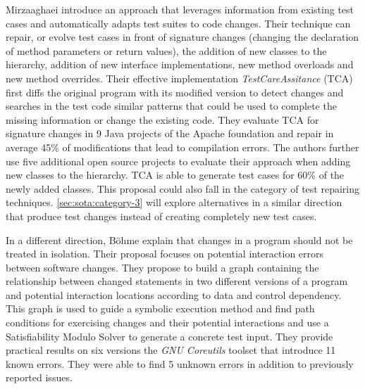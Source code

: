 Mirzaaghaei \etal\cite{Mirzaaghaei2012,mirzaaghaei2014automatic} introduce an approach that leverages information from existing test cases and automatically adapts test suites to code changes.
Their technique can repair, or evolve test cases in front of signature changes (\ie changing the declaration of method parameters or return values), the addition of new classes to the hierarchy, addition of new interface implementations, new method overloads and new method overrides. 
Their effective implementation \emph{TestCareAssitance} (TCA) first diffs the original program with its modified version to detect changes and searches in the test code similar patterns that could be used to complete the missing information or change the existing code. 
They evaluate TCA for signature changes in 9 Java projects of the Apache foundation and repair in average 45\% of modifications that lead to compilation errors. 
The authors further use five additional open source projects to evaluate their approach when adding new classes to the hierarchy. 
TCA is able to generate test cases for 60\% of the newly added classes.
This proposal could also fall in the category of test repairing techniques. 
\autoref{sec:sota:category-3} will explore alternatives in a similar direction that produce test changes instead of creating completely new test cases.

In a different direction, Böhme \etal\cite{bohme2013regression} explain that changes in a program should not be treated in isolation. 
Their proposal focuses on potential interaction errors between software changes. 
They propose to build a graph containing the relationship between changed statements in two different versions of a program and potential interaction locations according to data and control dependency. 
This graph is used to guide a symbolic execution method and find path conditions for exercising changes and their potential interactions and use a Satisfiability Modulo Solver to generate a concrete test input. 
They provide practical results on six versions the \emph{GNU Coreutils} toolset that introduce 11 known errors. They were able to find 5 unknown errors in addition to previously reported issues.

